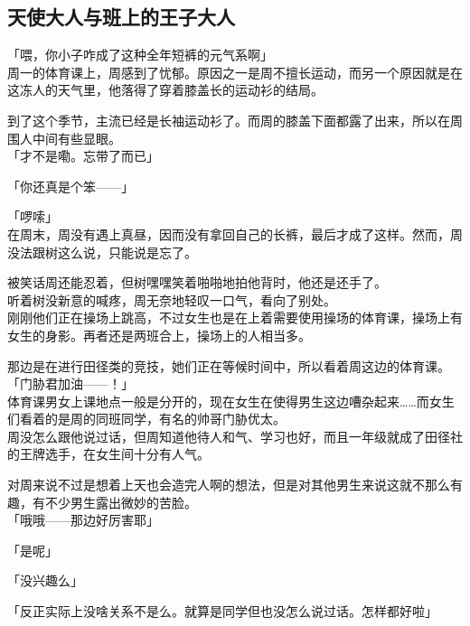 \subsection{天使大人与班上的王子大人}

「喂，你小子咋成了这种全年短裤的元气系啊」\\

周一的体育课上，周感到了忧郁。原因之一是周不擅长运动，而另一个原因就是在这冻人的天气里，他落得了穿着膝盖长的运动衫的结局。

到了这个季节，主流已经是长袖运动衫了。而周的膝盖下面都露了出来，所以在周围人中间有些显眼。\\

「才不是嘞。忘带了而已」

「你还真是个笨——」

「啰嗦」\\

在周末，周没有遇上真昼，因而没有拿回自己的长裤，最后才成了这样。然而，周没法跟树这么说，只能说是忘了。

被笑话周还能忍着，但树嘿嘿笑着啪啪地拍他背时，他还是还手了。\\

听着树没新意的喊疼，周无奈地轻叹一口气，看向了别处。\\

刚刚他们正在操场上跳高，不过女生也是在上着需要使用操场的体育课，操场上有女生的身影。再者还是两班合上，操场上的人相当多。

那边是在进行田径类的竞技，她们正在等候时间中，所以看着周这边的体育课。\\

「门胁君加油——！」\\

体育课男女上课地点一般是分开的，现在女生在使得男生这边嘈杂起来……而女生们看着的是周的同班同学，有名的帅哥门胁优太。\\

周没怎么跟他说过话，但周知道他待人和气、学习也好，而且一年级就成了田径社的王牌选手，在女生间十分有人气。

对周来说不过是想着上天也会造完人啊的想法，但是对其他男生来说这就不那么有趣，有不少男生露出微妙的苦脸。\\

「哦哦——那边好厉害耶」

「是呢」

「没兴趣么」

「反正实际上没啥关系不是么。就算是同学但也没怎么说过话。怎样都好啦」\\

